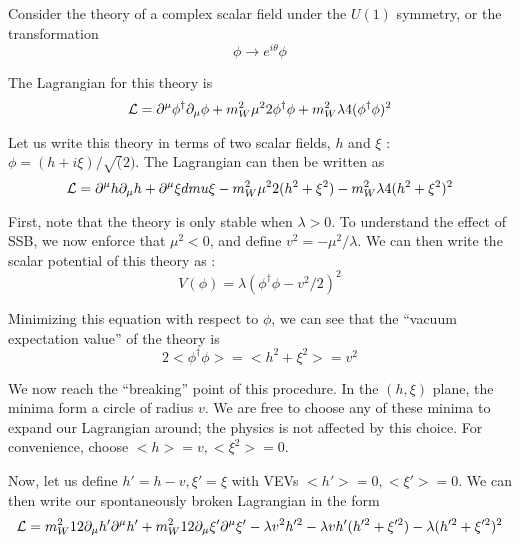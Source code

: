 Consider the theory of a complex scalar field under the $U(1)$ symmetry, or the transformation
\begin{equation}
\phi \rightarrow e^{i\theta} \phi
\end{equation}

The Lagrangian for this theory is
\begin{equation}
\mathcal{L} = \partial^\mu \phi^{\dag} \partial_\mu \phi + m_W^2{\mu^2}{2} \phi^{\dag} \phi + m_W^2{\lambda}{4} (\phi^\dag \phi)^2
\end{equation}

Let us write this theory in terms of two scalar fields, $h$ and $\xi$ : $\phi = (h + i\xi) / \sqrt(2)$.
The Lagrangian can then be written as
\begin{equation}
\mathcal{L} = \partial^\mu h \partial_\mu h + \partial^\mu \xi dmu \xi - m_W^2{\mu^2}{2} (h^2 + \xi^2) - m_W^2{\lambda}{4}(h^2 + \xi^2)^2
\end{equation}

First, note that the theory is only stable when $\lambda > 0$.
To understand the effect of SSB, we now enforce that $\mu^2 < 0$, and define $v^2 = -\mu^2/\lambda$.
We can then write the scalar potential of this theory as :
\begin{equation}
V(\phi) = \lambda (\phi^\dag \phi - v^2/2)^2
\end{equation}

Minimizing this equation with respect to $\phi$, we can see that the ``vacuum expectation value'' of the theory is
\begin{equation}
2<\phi^\dag \phi> = <h^2 + \xi^2 > = v^2
\end{equation}

We now reach the ``breaking'' point of this procedure.
In the $(h, \xi)$ plane, the minima form a circle of radius $v$.
We are free to choose any of these minima to expand our Lagrangian around; the physics is not affected by this choice.
For convenience, choose $<h> = v, <\xi^2> = 0$.

Now, let us define $h' = h - v , \xi' = \xi $ with VEVs $<h'> = 0 , <\xi'> = 0$.
We can then write our spontaneously broken Lagrangian in the form
\begin{equation}
\mathcal{L} = m_W^2{1}{2} \partial_\mu h' \partial^\mu h' +  m_W^2{1}{2} \partial_\mu \xi' \partial^\mu \xi' - \lambda v^2 h'^2 - \lambda v h' (h'^2 + \xi'^2 ) - \lambda (h'^2 + \xi'^2)^2
\end{equation}
